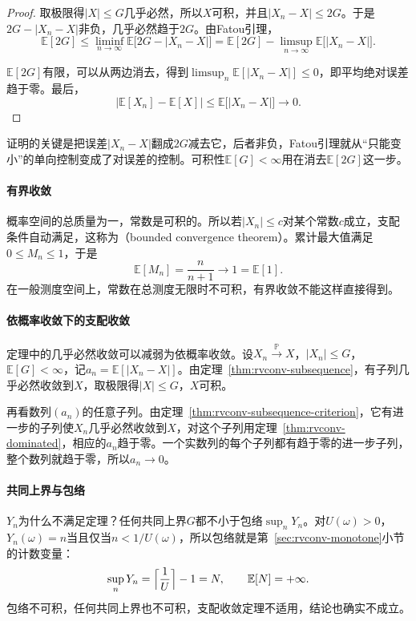 \begin{proof}
取极限得$\lvert X\rvert\leq G$几乎必然，所以$X$可积，并且$\lvert X_n-X\rvert\leq2G$。于是$2G-\lvert X_n-X\rvert$非负，几乎必然趋于$2G$。由Fatou引理，
\[
 \mathbb{E}[2G]\leq\liminf_{n\to\infty}\mathbb{E}\bigl[2G-\lvert X_n-X\rvert\bigr]=\mathbb{E}[2G]-\limsup_{n\to\infty}\mathbb{E}\bigl[\lvert X_n-X\rvert\bigr] .
\]

$\mathbb{E}[2G]$有限，可以从两边消去，得到$\limsup_n\mathbb{E}[\lvert X_n-X\rvert]\leq0$，即平均绝对误差趋于零。最后，
\[
 \bigl\lvert\mathbb{E}[X_n]-\mathbb{E}[X]\bigr\rvert\leq\mathbb{E}\bigl[\lvert X_n-X\rvert\bigr]\to0 .
\]
\end{proof}

证明的关键是把误差$\lvert X_n-X\rvert$翻成$2G$减去它，后者非负，Fatou引理就从“只能变小”的单向控制变成了对误差的控制。可积性$\mathbb{E}[G]<\infty$用在消去$\mathbb{E}[2G]$这一步。

\paragraph{有界收敛}
概率空间的总质量为一，常数是可积的。所以若$\lvert X_n\rvert\leq c$对某个常数$c$成立，支配条件自动满足，这称为（bounded convergence theorem）。累计最大值满足$0\leq M_n\leq1$，于是
\[
 \mathbb{E}[M_n]=\frac{n}{n+1}\to1=\mathbb{E}[1] .
\]
在一般测度空间上，常数在总测度无限时不可积，有界收敛不能这样直接得到。

\paragraph{依概率收敛下的支配收敛}
定理中的几乎必然收敛可以减弱为依概率收敛。设$X_n\xrightarrow{\mathbb{P}}X$，$\lvert X_n\rvert\leq G$，$\mathbb{E}[G]<\infty$，记$a_n=\mathbb{E}[\lvert X_n-X\rvert]$。由定理~\ref{thm:rvconv-subsequence}，有子列几乎必然收敛到$X$，取极限得$\lvert X\rvert\leq G$，$X$可积。

再看数列$(a_n)$的任意子列。由定理~\ref{thm:rvconv-subsequence-criterion}，它有进一步的子列使$X_n$几乎必然收敛到$X$，对这个子列用定理~\ref{thm:rvconv-dominated}，相应的$a_n$趋于零。一个实数列的每个子列都有趋于零的进一步子列，整个数列就趋于零，所以$a_n\to0$。

\paragraph{共同上界与包络}
$Y_n$为什么不满足定理？任何共同上界$G$都不小于包络$\sup_nY_n$。对$U(\omega)>0$，$Y_n(\omega)=n$当且仅当$n<1/U(\omega)$，所以包络就是第~\ref{sec:rvconv-monotone}小节的计数变量：
\[
 \sup_nY_n=\Bigl\lceil\frac1U\Bigr\rceil-1=N,\qquad \mathbb{E}[N]=+\infty .
\]
包络不可积，任何共同上界也不可积，支配收敛定理不适用，结论也确实不成立。

